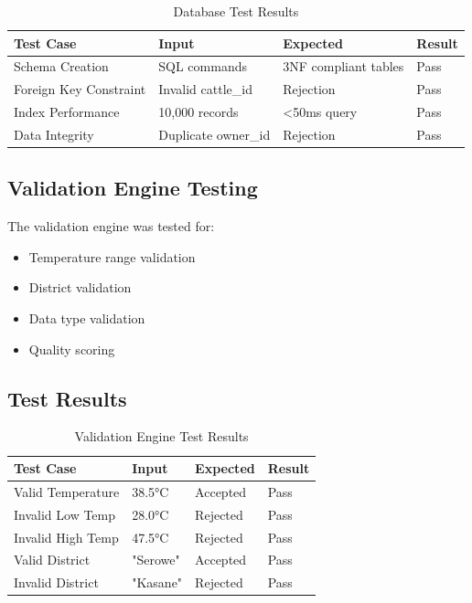 \begin{table}[H]
\centering
\begin{tabular}{|l|l|l|l|}
\hline
\textbf{Test Case} & \textbf{Input} & \textbf{Expected} & \textbf{Result} \\
\hline
Schema Creation & SQL commands & 3NF compliant tables & Pass \\
Foreign Key Constraint & Invalid cattle\_id & Rejection & Pass \\
Index Performance & 10,000 records & <50ms query & Pass \\
Data Integrity & Duplicate owner\_id & Rejection & Pass \\
\hline
\end{tabular}
\caption{Database Test Results}
\end{table}

\subsection{Validation Engine Testing}

The validation engine was tested for:

\begin{itemize}
    \item Temperature range validation
    \item District validation
    \item Data type validation
    \item Quality scoring
\end{itemize}

\subsection{Test Results}

\begin{table}[H]
\centering
\begin{tabular}{|l|l|l|l|}
\hline
\textbf{Test Case} & \textbf{Input} & \textbf{Expected} & \textbf{Result} \\
\hline
Valid Temperature & 38.5°C & Accepted & Pass \\
Invalid Low Temp & 28.0°C & Rejected & Pass \\
Invalid High Temp & 47.5°C & Rejected & Pass \\
Valid District & "Serowe" & Accepted & Pass \\
Invalid District & "Kasane" & Rejected & Pass \\
\hline
\end{tabular}
\caption{Validation Engine Test Results}
\end{table}

